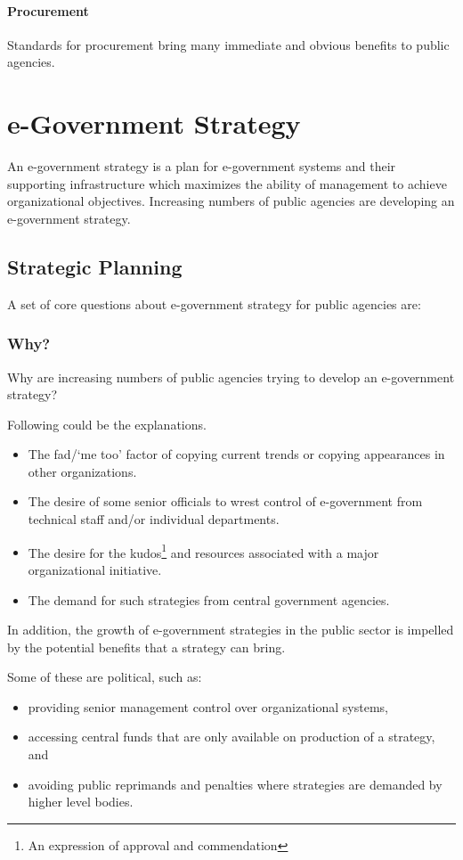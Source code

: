 \paragraph*{Procurement}
Standards for procurement bring many
immediate and obvious benefits to public
agencies.

\section{e-Government Strategy}
An e-government strategy is a plan for e-government systems and their supporting
infrastructure which maximizes the ability of management to achieve organizational objectives. Increasing numbers of public agencies are developing an e-government
strategy.

\subsection*{Strategic Planning}
A set of core questions about e-government strategy for public agencies are:


\subsubsection*{Why?}
Why are increasing numbers of public agencies trying to develop an e-government strategy?

Following could be the explanations.
\begin{itemize}
	\item The fad/`me too’ factor of copying current trends or copying appearances in
	other organizations.
	\item The desire of some senior officials to wrest control of e-government from technical staff and/or individual departments.
	\item The desire for the kudos\footnote{An expression of approval and commendation} and resources associated with a major organizational
	initiative.
	\item The demand for such strategies from central government agencies.
\end{itemize}

In addition, the growth of e-government strategies in the public sector is
impelled by the potential benefits that a strategy can bring. 

Some of these are political, such as:
\begin{itemize}
	\item providing senior management control over organizational systems, 
	\item accessing central funds that are only	available on production of a strategy, and 
	\item avoiding public reprimands and penalties where strategies are demanded by higher level bodies.
\end{itemize}

